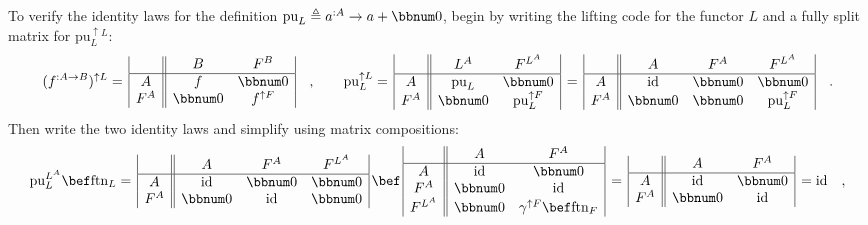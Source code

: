 To verify the identity laws for the definition $\text{pu}_{L}\triangleq a^{:A}\rightarrow a+\bbnum 0$,
begin by writing the lifting code for the functor $L$ and a fully
split matrix for $\text{pu}_{L}^{\uparrow L}$:
\[
(f^{:A\rightarrow B})^{\uparrow L}=\,\begin{array}{|c||cc|}
 & B & F^{B}\\
\hline A & f & \bbnum 0\\
F^{A} & \bbnum 0 & f^{\uparrow F}
\end{array}\quad,\quad\quad\text{pu}_{L}^{\uparrow L}=\,\begin{array}{|c||cc|}
 & L^{A} & F^{L^{A}}\\
\hline A & \text{pu}_{L} & \bbnum 0\\
F^{A} & \bbnum 0 & \text{pu}_{L}^{\uparrow F}
\end{array}\,=\,\begin{array}{|c||ccc|}
 & A & F^{A} & F^{L^{A}}\\
\hline A & \text{id} & \bbnum 0 & \bbnum 0\\
F^{A} & \bbnum 0 & \bbnum 0 & \text{pu}_{L}^{\uparrow F}
\end{array}\quad.
\]
Then write the two identity laws and simplify using matrix compositions:
\[
\text{pu}_{L}^{L^{A}}\bef\text{ftn}_{L}=\,\begin{array}{|c||ccc|}
 & A & F^{A} & F^{L^{A}}\\
\hline A & \text{id} & \bbnum 0 & \bbnum 0\\
F^{A} & \bbnum 0 & \text{id} & \bbnum 0
\end{array}\,\bef\,\begin{array}{|c||cc|}
 & A & F^{A}\\
\hline A & \text{id} & \bbnum 0\\
F^{A} & \bbnum 0 & \text{id}\\
F^{L^{A}} & \bbnum 0 & \gamma^{\uparrow F}\bef\text{ftn}_{F}
\end{array}\,=\,\begin{array}{|c||cc|}
 & A & F^{A}\\
\hline A & \text{id} & \bbnum 0\\
F^{A} & \bbnum 0 & \text{id}
\end{array}\,=\text{id}\quad,
\]
